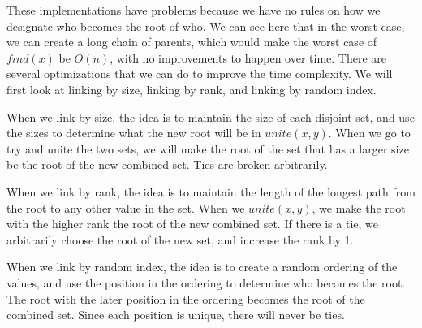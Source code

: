 \documentclass[conference]{IEEEtran}
\begin{document}




These implementations have problems because we have no rules on how we designate who becomes the root of who. We can see here that in the worst case, we can create a long chain of parents, which would make the worst case of $find(x)$ be $O(n)$, with no improvements to happen over time. There are several optimizations that we can do to improve the time complexity. We will first look at linking by size, linking by rank, and linking by random index.

When we link by size, the idea is to maintain the size of each disjoint set, and use the sizes to determine what the new root will be in $unite(x, y)$. When we go to try and unite the two sets, we will make the root of the set that has a larger size be the root of the new combined set. Ties are broken arbitrarily.



When we link by rank, the idea is to maintain the length of the longest path from the root to any other value in the set. When we $unite(x, y)$, we make the root with the higher rank the root of the new combined set. If there is a tie, we arbitrarily choose the root of the new set, and increase the rank by 1.



When we link by random index, the idea is to create a random ordering of the values, and use the position in the ordering to determine who becomes the root. The root with the later position in the ordering becomes the root of the combined set. Since each position is unique, there will never be ties.


\end{document}
